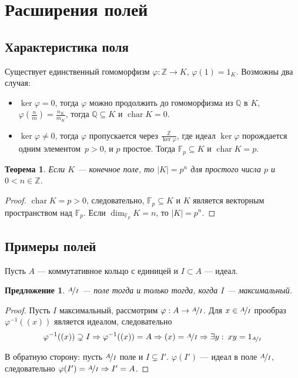 \documentclass[a4paper]{article}
\newcommand{\Q}{\ensuremath{\mathbb{Q}}}
\newcommand{\Z}{\ensuremath{\mathbb{Z}}}
\newcommand{\F}{\ensuremath{\mathbb{F}}}
\let\temp\phi
\let\phi\varphi
\let\varphi\temp
\DeclareMathOperator{\chr}{char}
\newtheorem{theorem}{Теорема}
\numberwithin{theorem}{section}
\numberwithin{lemma}{section}
\newtheorem{proposition}{Предложение}
\numberwithin{proposition}{section}
\numberwithin{corollary}{section}
\begin{document}
\section{Расширения полей}

\subsection*{Характеристика поля}
Существует единственный гомоморфизм $\phi: \Z \to K$, $\phi(1) = 1_K$.
Возможны два случая:
\begin{itemize}
    \item $\ker \phi = 0$, тогда $\phi$ можно продолжить до гомоморфизма из $\Q$ в $K$,
    $\phi(\frac{n}{m}) = \frac{n_K}{m_K}$,
    тогда $\Q \subseteq K$ и $\chr K = 0$.
    \item
    \begin{minipage}{0.9\linewidth}
        $\ker \phi \ne 0$, тогда $\phi$ пропускается через $\frac{\Z}{\ker \phi}$, где идеал $\ker \phi$ порождается одним элементом~$p > 0$, и $p$ простое.
        Тогда $\F_p \subseteq K$ и $\chr K = p$.
    \end{minipage}
    \begin{minipage}{0.15\linewidth}
    \end{minipage}
\end{itemize}

\begin{theorem}
Если $K$ --- конечное поле, то $|K| = p^n$ для простого числа $p$ и $0 < n \in \Z$.
\end{theorem}
\begin{proof}
$\chr K = p > 0$, следовательно, $\F_p \subseteq K$ и $K$ является векторным пространством над $\F_p$. Если $\dim_{\F_p}K = n$, то $|K| = p^n$.
\end{proof}

\subsection*{Примеры полей}

Пусть $A$ --- коммутативное кольцо с единицей и $I \subset A$ --- идеал.
\begin{proposition}
$\nicefrac{A}{I}$ --- поле тогда и только тогда, когда $I$ --- максимальный.
\end{proposition}
\begin{proof}
Пусть $I$ максимальный, рассмотрим $\phi: A \to \nicefrac{A}{I}$.
Для $x \in \nicefrac{A}{I}$ прообраз $\phi^{-1}((x))$ является идеалом, следовательно
\[\phi^{-1}((x)) \supsetneq I
\Rightarrow \phi^{-1}((x)) = A
\Rightarrow (x) = \nicefrac{A}{I}
\Rightarrow \exists y : \: xy = 1_{\nicefrac{A}{I}}\]

В обратную сторону: пусть $\nicefrac{A}{I}$ поле и $I \subsetneq I'$. $\phi(I')$ --- идеал в
поле $\nicefrac{A}{I}$, следовательно $\phi(I') = \nicefrac{A}{I} \Rightarrow I' = A$.
\end{proof}
\end{document}
